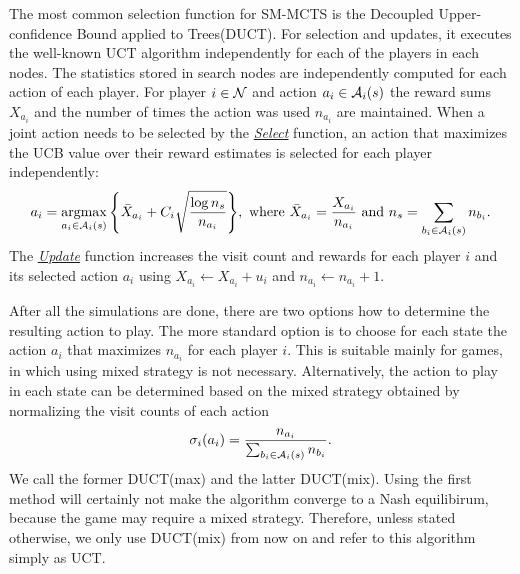 The most common selection function for SM-MCTS is the Decoupled Upper-confidence Bound applied to Trees(DUCT).
For selection and updates, it executes the well-known UCT \cite{UCT} algorithm independently for each of the players in each nodes.
The statistics stored in search nodes are independently computed for each action of each player. For player $i\in \mathcal{N}$ and action $a_i \in \mathcal{A}_i(s)$ the reward sums $X_{a_i}$ and the number of times the action was used $n_{a_i}$ are maintained.
When a joint action needs to be selected by the \emph{\underline{Select}} function, an action that maximizes the UCB value over their reward estimates is selected for each player independently:
\begin{equation}
a_i = \argmax_{a_i \in \cA_i(s)}{ \left\{ \bar{X}_{a_i} + C_i \sqrt{\frac{\log n_s}{n_{a_i}}} \right\} },
  \mbox{ where } \bar{X}_{a_i} = \frac{X_{a_i}}{n_{a_i}} \mbox{ and } n_s=\sum_{b_i \in \cA_i(s)} n_{b_i}.\label{eq:uct}
\end{equation}
\noindent The \emph{\underline{Update}} function increases the visit count and rewards for each player $i$ and its selected action $a_i$ using $X_{a_i} \leftarrow X_{a_i} + u_i$
and $n_{a_i} \leftarrow n_{a_i} + 1$.

After all the simulations are done, there are two options how to determine the resulting action to play.
The more standard option is to choose for each state the action $a_i$ that maximizes $n_{a_i}$ for each player $i$.
This is suitable mainly for games, in which using mixed strategy is not necessary.
Alternatively, the action to play in each state can be determined based on the mixed strategy obtained by normalizing the visit counts of each action 
\begin{equation}
\sigma_i(a_i) = \frac{n_{a_i}}{\sum_{b_i\in \mathcal{A}_i(s)} n_{b_i}}.
\end{equation}
We call the former DUCT(max) and the latter DUCT(mix).
Using the first method will certainly not make the algorithm converge to a Nash equilibirum, because the game may require a mixed strategy.
Therefore, unless stated otherwise, we only use DUCT(mix) from now on and refer to this algorithm simply as UCT.

